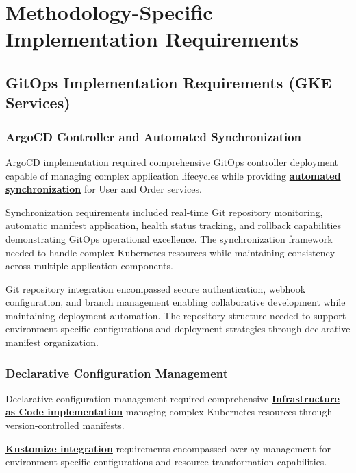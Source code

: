 \section{Methodology-Specific Implementation Requirements}

\subsection{GitOps Implementation Requirements (GKE Services)}

\subsubsection{ArgoCD Controller and Automated Synchronization}
ArgoCD implementation required comprehensive GitOps controller deployment capable of managing complex application lifecycles while providing \textbf{\hyperref[argo_cd_docs]{automated synchronization}} for User and Order services.

Synchronization requirements included real-time Git repository monitoring, automatic manifest application, health status tracking, and rollback capabilities demonstrating GitOps operational excellence. The synchronization framework needed to handle complex Kubernetes resources while maintaining consistency across multiple application components.

Git repository integration encompassed secure authentication, webhook configuration, and branch management enabling collaborative development while maintaining deployment automation. The repository structure needed to support environment-specific configurations and deployment strategies through declarative manifest organization.

\subsubsection{Declarative Configuration Management}
Declarative configuration management required comprehensive \textbf{\hyperref[kubernetes_docs]{Infrastructure as Code implementation}} managing complex Kubernetes resources through version-controlled manifests.


\textbf{\hyperref[kubernetes_docs]{Kustomize integration}} requirements encompassed overlay management for environment-specific configurations and resource transformation capabilities.

